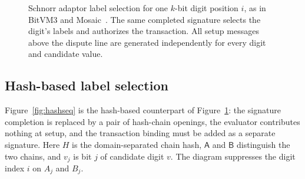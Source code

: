 \documentclass[11pt]{article}
\begin{document}
\begin{figure}[t!]
\caption{Schnorr adaptor label selection for one $k$-bit digit position $i$,
as in BitVM3 and Mosaic~\cite{bitvm3paper,mosaic26}. The same completed
signature selects the digit's labels and authorizes the transaction. All
setup messages above the dispute line are generated independently for every
digit and candidate value.}
\label{fig:adaptorseq}
\end{figure}

\subsection{Hash-based label selection}\label{app:hashsel}

Figure~\ref{fig:hashseq} is the hash-based counterpart of
Figure~\ref{fig:adaptorseq}: the signature completion is replaced by a pair of
hash-chain openings, the evaluator contributes nothing at setup, and the
transaction binding must be added as a separate signature.
Here $H$ is the domain-separated chain hash, $\mathsf{A}$ and $\mathsf{B}$
distinguish the two chains, and $v_j$ is bit $j$ of candidate digit $v$. The diagram suppresses the
digit index $i$ on $A_j$ and $B_j$.
\end{document}
